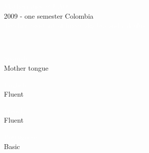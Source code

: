 \documentclass[letterpaper]{article}
\begin{document}
\begin{minipage}{1.\linewidth}
{\begin{minipage}{0.47\linewidth}
\begin{minipage}{1\linewidth}
		\begin{minipage}{0.9\linewidth}
			{\normalsize \textcolor{white}{Mathematics @ 
			UAO}}\\					
			{\small\textcolor{gray!40}{2009 - one semester \hfill Colombia}}\\
			{\small\textcolor{white}{Teacher assistant of linear algebra and 
			calculus}}\\
			\vspace{1ex}
		\end{minipage} 
	\end{minipage} %
	\begin{minipage}{1\linewidth} %
		\\
		\vspace{2ex}
		\begin{minipage}{0.28\linewidth}
			\centering
			{\normalsize \textcolor{white}{Spanish}}\\
			{\small\textcolor{gray!40}{Mother tongue}}\\
		\end{minipage} 
		\begin{minipage}{0.18\linewidth}
			\centering
			{\normalsize \textcolor{white}{English}}\\					
			{\small\textcolor{gray!40}{Fluent}}\\
		\end{minipage} 
		\begin{minipage}{0.2\linewidth}
			\centering
			{\normalsize \textcolor{white}{French}}\\					
			{\small\textcolor{gray!40}{Fluent}}\\
		\end{minipage}
		\begin{minipage}{0.2\linewidth}
			\centering
			{\normalsize \textcolor{white}{Portuguese}}\\					
			{\small\textcolor{gray!40}{Basic}}\\
		\end{minipage}\\
		\vspace{3ex}
	\end{minipage} %
	\begin{minipage}{1\linewidth} %
		\begin{minipage}{0.47\linewidth}

\end{minipage}
\end{minipage}
\end{minipage}}
\end{minipage}
\end{document}
